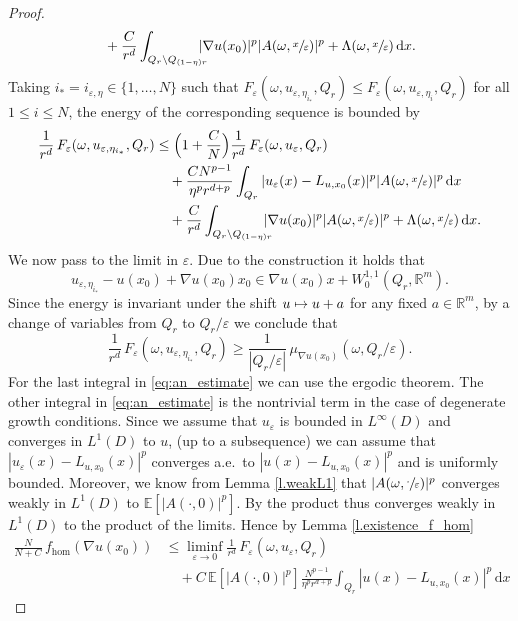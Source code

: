 \documentclass[JEP,XML,SOM,Unicode,published]{cedram}
\def\mto{\mathchoice{\longmapsto}{\mapsto}{\mapsto}{\mapsto}}
\theoremstyle{definition}
\let\e\varepsilon
\let\w\omega
\newcommand{\dx}{\,\mathrm{d}x}
\newcommand{\R}{\mathbb{R}}
\begin{document}
\begin{proof}
\begin{align*}
&\quad+\frac{C}{r^d}\int_{Q_r\setminus Q_{(1-\eta)r}}\hspace*{-3mm}|\nabla u(x_0)|^p|A(\w,\sfrac{x}{\e})|^p+\Lambda(\w,\sfrac{x}{\e})\dx.
\end{align*}
Taking $i_*=i_{\e,\eta}\in\{1,\ldots,N\}$ such that $F_{\e}(\w,u_{\e,\eta_{i_*}},Q_r)\leq F_{\e}(\w,u_{\e,\eta_i},Q_r)$ for all $1\leq i\leq N$, the energy of the corresponding sequence is bounded by
\begin{align}\label{eq:an_estimate}
\frac{1}{r^d}\,F_{\e}(\w,u_{\e,\eta_{i_*}},Q_r)&\leq \Bigl(1+\frac{C}{N}\Bigr)\frac{1}{r^d}\,F_{\e}(\w,u_{\e},Q_r)
\\
&\quad +\frac{CN^{p-1}}{\eta^p r^{d+p}}\int_{Q_r}|u_{\e}(x)-L_{u,x_0}(x)|^p|A(\w,\sfrac{x}{\e})|^p\dx\nonumber
\\
&\quad + \frac{C}{r^d}\int_{Q_r\setminus Q_{(1-\eta)r}}\hspace*{-3mm}|\nabla u(x_0)|^p|A(\w,\sfrac{x}{\e})|^p+\Lambda(\w,\sfrac{x}{\e})\dx. \nonumber
\end{align}
We now pass to the limit in $\e$. Due to the construction it holds that
\[
u_{\e,\eta_{i_*}}-u(x_0)+\nabla u(x_0)x_0\in \nabla u(x_0)x+W^{1,1}_0(Q_r,\R^m).
\]
Since the energy is invariant under the shift $u\mto u+a$ for any fixed $a\in\R^m$, by a change of variables from $Q_r$ to $Q_r/\e$ we conclude that
\begin{equation*}
\frac{1}{r^d}\,F_{\e}(\w,u_{\e,\eta_{i_*}},Q_r)\geq \frac{1}{|Q_r/\e|}\,\mu_{\nabla u(x_0)}(\w,Q_r/\e).
\end{equation*}
For the last integral in \eqref{eq:an_estimate} we can use the ergodic theorem. The other integral in \eqref{eq:an_estimate} is the nontrivial term in the case of degenerate growth conditions. Since we assume that $u_{\e}$ is bounded in $L^{\infty}(D)$ and converges in $L^1(D)$ to $u$, (up to a subsequence) we can assume that $|u_{\e}(x)-L_{u,x_0}(x)|^p$ converges a.e.\ to $|u(x)-L_{u,x_0}(x)|^p$ and is uniformly bounded. Moreover, we know from Lemma \ref{l.weakL1} that $|A(\w,\sfrac{\cdot}{\e})|^p$ converges weakly in $L^1(D)$ to $\mathbb{E}[|A(\cdot,0)|^p]$. By \cite[Prop.\,2.61]{FoLe} the product thus converges weakly in $L^1(D)$ to the product of the limits. Hence by Lemma \ref{l.existence_f_hom}
\begin{align*}
\frac{N}{N+C}\,f_{\hom}(\nabla u(x_0))&\leq \liminf_{\e\to 0}\frac{1}{r^d}\,F_{\e}(\w,u_{\e},Q_r)\nonumber
\\
&\quad +C\,\mathbb{E}[|A(\cdot,0)|^p]\frac{N^{p-1}}{\eta^p r^{d+p}}\int_{Q_r}|u(x)-L_{u,x_0}(x)|^p\dx

\end{align*}
\end{proof}
\end{document}
